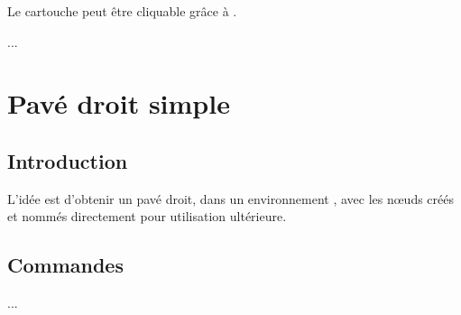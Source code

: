 \documentclass{article}
\newcommand\ctex[1]{\tcbox[vignettelatex]{#1}}
\begin{document}
\begin{codeinfo}
Le \textsf{cartouche} peut être \og cliquable \fg{} grâce à \ctex{href}.
\end{codeinfo}

\begin{codetex}
\usepackage{hyperref}
...
\href{https://capytale2.ac-paris.fr/web/c/abcd-12345}{}
\end{codetex}

\begin{codesortie}
\href{https://capytale2.ac-paris.fr/web/c/abcd-12345}{}
\end{codesortie}

\newpage

\section{Pavé droit \og simple \fg{}}

\subsection{Introduction}

\begin{codeidee}
L'idée est d'obtenir un pavé droit, dans un environnement \TikZ, avec les nœuds créés et nommés directement pour utilisation ultérieure.
\end{codeidee}

\subsection{Commandes}

\begin{codetex}
...
\end{codetex}
\end{document}

